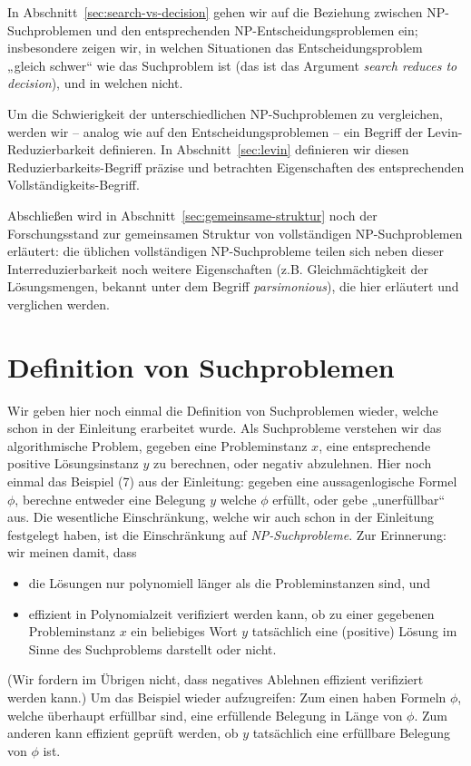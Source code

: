 In Abschnitt~\ref{sec:search-vs-decision} gehen wir auf die Beziehung zwischen NP-Suchproblemen und den entsprechenden NP-Entscheidungsproblemen ein; insbesondere zeigen wir, in welchen Situationen das Entscheidungsproblem „gleich schwer“ wie das Suchproblem ist (das ist das Argument \emph{search reduces to decision}), und in welchen nicht.

Um die Schwierigkeit der unterschiedlichen NP-Suchproblemen zu vergleichen, werden wir -- analog wie auf den Entscheidungsproblemen -- ein Begriff der Levin-Reduzierbarkeit definieren. In Abschnitt~\ref{sec:levin} definieren wir diesen Reduzierbarkeits-Begriff präzise und betrachten Eigenschaften des entsprechenden Vollständigkeits-Begriff.

Abschließen wird in Abschnitt~\ref{sec:gemeinsame-struktur} noch der Forschungsstand zur gemeinsamen Struktur von vollständigen NP-Suchproblemen erläutert: die üblichen vollständigen NP-Suchprobleme teilen sich neben dieser Interreduzierbarkeit noch weitere Eigenschaften (z.B. Gleichmächtigkeit der Lösungsmengen, bekannt unter dem Begriff \emph{parsimonious}), die hier erläutert und verglichen werden. 

\section{Definition von Suchproblemen}\label{sec:searchproblems-def}

Wir geben hier noch einmal die Definition von Suchproblemen wieder, welche schon in der Einleitung erarbeitet wurde.
Als Suchprobleme verstehen wir das algorithmische Problem, gegeben eine Probleminstanz $x$, eine entsprechende positive Lösungsinstanz $y$ zu berechnen, oder negativ abzulehnen.  Hier noch einmal das Beispiel (7) aus der Einleitung: gegeben eine aussagenlogische Formel $\phi$, berechne entweder eine Belegung $y$ welche $\phi$ erfüllt, oder gebe „unerfüllbar“ aus.
Die wesentliche Einschränkung, welche wir auch schon in der Einleitung festgelegt haben, ist die Einschränkung auf \emph{NP-Suchprobleme}. Zur Erinnerung: wir meinen damit, dass
\begin{itemize}
    \item die Lösungen nur polynomiell länger als die Probleminstanzen sind, und
    \item effizient in Polynomialzeit verifiziert werden kann, ob zu einer gegebenen Probleminstanz $x$ ein beliebiges Wort $y$ tatsächlich eine (positive) Lösung im Sinne des Suchproblems darstellt oder nicht.
\end{itemize}
(Wir fordern im Übrigen nicht, dass negatives Ablehnen effizient verifiziert werden kann.)
Um das Beispiel wieder aufzugreifen: Zum einen haben Formeln $\phi$, welche überhaupt erfüllbar sind, eine erfüllende Belegung in Länge von $\phi$. Zum anderen kann effizient geprüft werden, ob $y$ tatsächlich eine erfüllbare Belegung von $\phi$ ist.

